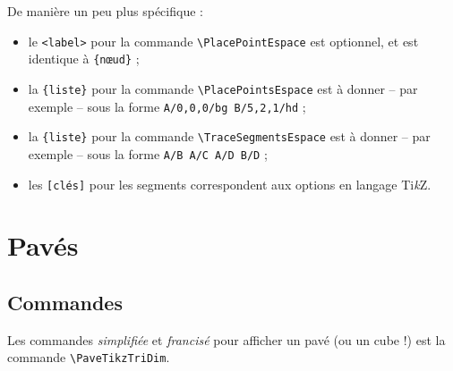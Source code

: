 \documentclass[french,a4paper,11pt]{article}
\providecommand\tikzlogo{Ti\textit{k}Z}
\let\TikZ\tikzlogo
\begin{document}
\begin{tipblock}
De manière un peu plus spécifique :

\begin{itemize}
	\item le \texttt{<label>} pour la commande \texttt{\textbackslash PlacePointEspace} est optionnel, et est identique à \texttt{\{nœud\}} ;
	\item la \texttt{\{liste\}} pour la commande \texttt{\textbackslash PlacePointsEspace} est à donner -- par exemple -- sous la forme \texttt{A/0,0,0/bg B/5,2,1/hd} ;
	\item la \texttt{\{liste\}} pour la commande \texttt{\textbackslash TraceSegmentsEspace} est à donner -- par exemple -- sous la forme \texttt{A/B A/C A/D B/D} ;
	\item les \texttt{[clés]} pour les segments correspondent aux options en langage \TikZ.
\end{itemize}
\vspace*{-\baselineskip}\leavevmode
\end{tipblock}

\begin{PresCode}{}
\begin{EnvTikzEspace}[VueClassique]
\end{EnvTikzEspace}
\end{PresCode}

\pagebreak

\section{Pavés}

\subsection{Commandes}

\begin{cautionblock}
Les commandes \textit{simplifiée} et \textit{francisé} pour afficher un pavé (ou un cube !) est  la commande \texttt{\textbackslash PaveTikzTriDim}.
\end{cautionblock}
\end{document}
